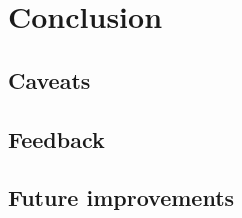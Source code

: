 \chapter{Conclusion} \label{chapter6}

\section{Caveats} \label{6:caveats}

\section{Feedback} \label{6:feedback}

\section{Future improvements} \label{6:future}